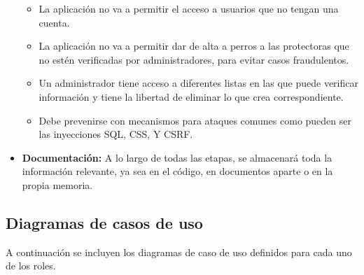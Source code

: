 \documentclass[a4paper, 12pt]{article}
\begin{document}
\begin{itemize}[noitemsep]
\begin{itemize}[noitemsep]
			\item La aplicación no va a permitir el acceso a usuarios que no tengan una cuenta.
			\item La aplicación no va a permitir dar de alta a perros a las protectoras que no estén verificadas por administradores, para evitar casos fraudulentos.
			\item Un administrador tiene acceso a diferentes listas en las que puede verificar información y tiene la libertad de eliminar lo que crea correspondiente.
			\item Debe prevenirse con mecanismos para ataques comunes como pueden ser las inyecciones SQL, CSS, Y CSRF. 
		\end{itemize}
	\item \textbf{Documentación:} A lo largo de todas las etapas, se almacenará toda la información relevante, ya sea en el código, en documentos aparte o en la propia memoria.
\end{itemize}

\subsection{Diagramas de casos de uso}

A continuación se incluyen los diagramas de caso de uso definidos para cada uno de los roles.
\end{document}
